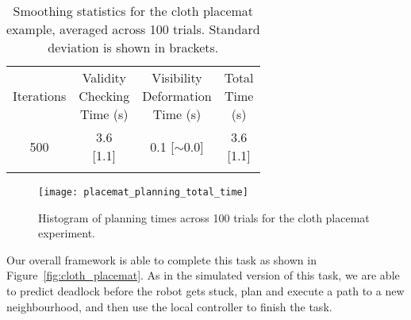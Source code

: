 \begin{table}[h]
\centering
\caption{Smoothing statistics for the cloth placemat example, averaged across 100 trials. Standard deviation is shown in brackets.}
\label{tab:live_robot_stats_smoothing}
\begin{tabular}{cccc}
\noalign{\smallskip}\hline\noalign{\smallskip}
Iterations & 
\makecell{Validity\\Checking\\Time (s)} &
\makecell{Visibility\\Deformation\\Time (s)} &
\makecell{Total\\Time\\(s)} \\
\noalign{\smallskip}\hline\noalign{\smallskip}
500 &
\makecell{3.6\\{[1.1]}} &
\makecell{0.1\\{[$\sim$0.0]}} &
\makecell{3.6\\{[1.1]}} \\
\noalign{\smallskip}\hline
\end{tabular}
\end{table}

\begin{figure}[h]
    \centering
    \texttt{[image: placemat\_planning\_total\_time]}
    \caption{Histogram of planning times across 100 trials for the cloth placemat experiment.}
    \label{fig:placemat_planning_time}
\end{figure}

Our overall framework is able to complete this task as shown in Figure~\ref{fig:cloth_placemat}. As in the simulated version of this task, we are able to predict deadlock before the robot gets stuck, plan and execute a path to a new neighbourhood, and then use the local controller to finish the task.
